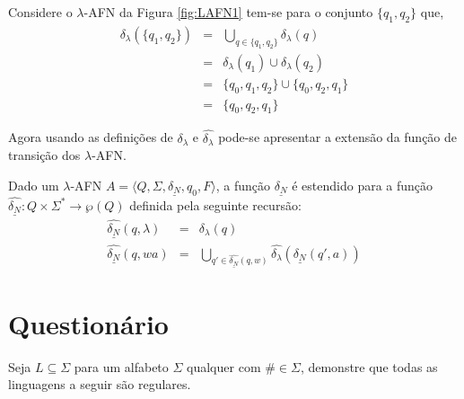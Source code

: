 \begin{exemplo}
	Considere o $\lambda$-AFN da Figura \ref{fig:LAFN1} tem-se para o conjunto $\{q_1, q_2\}$ que,
	\begin{eqnarray*}
		\widehat{\delta_\lambda}(\{q_1, q_2\}) & = & \bigcup_{q \in \{q_1, q_2\}} \delta_\lambda(q)\\
		& = & \delta_\lambda(q_1) \cup \delta_\lambda(q_2)\\
		& = & \{q_0, q_1, q_2\} \cup \{q_0, q_2, q_1\}\\
		& = & \{q_0, q_2, q_1\}
	\end{eqnarray*}
\end{exemplo}

Agora usando as definições de $\delta_\lambda$ e $\widehat{\delta_\lambda}$ pode-se apresentar a extensão da função de transição dos $\lambda$-AFN.

\begin{definicao}\label{def:FuncaoLDeltaNDEstendida}
	Dado um $\lambda$-AFN  $A = \langle Q, \Sigma, \underline{\delta_N}, q_0, F\rangle$, a função $\underline{\delta_N}$ é estendido para a função $\widehat{\underline{\delta_N}}: Q \times \Sigma^* \rightarrow \wp(Q)$ definida pela seguinte recursão:
	\begin{eqnarray}\label{eq:FuncaoLDeltaNDEstendida}
		\widehat{\underline{\delta_N}}(q, \lambda)& = &  \delta_\lambda(q)\\
		\widehat{\underline{\delta_N}}(q, wa) & = & \bigcup_{q' \in \widehat{\underline{\delta_N}}(q, w)} \widehat{\delta_\lambda}(\underline{\delta_N}(q', a))
	\end{eqnarray}
\end{definicao}

\section{Questionário}\label{sec:Questionario2part1}

\begin{questao}\label{exer:AF1}
	Seja $L \subseteq \Sigma$ para um alfabeto $\Sigma$ qualquer com $\# \in \Sigma$, demonstre que todas as linguagens a seguir são regulares.
\end{questao}

